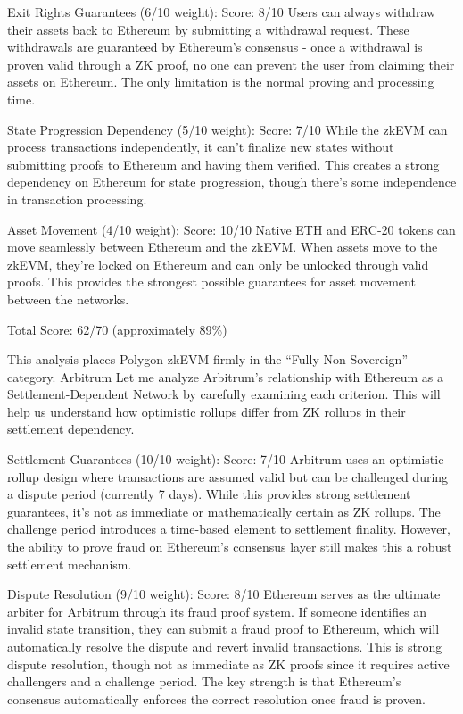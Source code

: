 \documentclass[
  letterpaper,
  DIV=11,
  numbers=noendperiod]{scrreprt}
\begin{document}
Exit Rights Guarantees (6/10 weight): Score: 8/10 Users can always
withdraw their assets back to Ethereum by submitting a withdrawal
request. These withdrawals are guaranteed by Ethereum's consensus - once
a withdrawal is proven valid through a ZK proof, no one can prevent the
user from claiming their assets on Ethereum. The only limitation is the
normal proving and processing time.

State Progression Dependency (5/10 weight): Score: 7/10 While the zkEVM
can process transactions independently, it can't finalize new states
without submitting proofs to Ethereum and having them verified. This
creates a strong dependency on Ethereum for state progression, though
there's some independence in transaction processing.

Asset Movement (4/10 weight): Score: 10/10 Native ETH and ERC-20 tokens
can move seamlessly between Ethereum and the zkEVM. When assets move to
the zkEVM, they're locked on Ethereum and can only be unlocked through
valid proofs. This provides the strongest possible guarantees for asset
movement between the networks.

Total Score: 62/70 (approximately 89\%)

This analysis places Polygon zkEVM firmly in the ``Fully Non-Sovereign''
category. Arbitrum Let me analyze Arbitrum's relationship with Ethereum
as a Settlement-Dependent Network by carefully examining each criterion.
This will help us understand how optimistic rollups differ from ZK
rollups in their settlement dependency.

Settlement Guarantees (10/10 weight): Score: 7/10 Arbitrum uses an
optimistic rollup design where transactions are assumed valid but can be
challenged during a dispute period (currently 7 days). While this
provides strong settlement guarantees, it's not as immediate or
mathematically certain as ZK rollups. The challenge period introduces a
time-based element to settlement finality. However, the ability to prove
fraud on Ethereum's consensus layer still makes this a robust settlement
mechanism.

Dispute Resolution (9/10 weight): Score: 8/10 Ethereum serves as the
ultimate arbiter for Arbitrum through its fraud proof system. If someone
identifies an invalid state transition, they can submit a fraud proof to
Ethereum, which will automatically resolve the dispute and revert
invalid transactions. This is strong dispute resolution, though not as
immediate as ZK proofs since it requires active challengers and a
challenge period. The key strength is that Ethereum's consensus
automatically enforces the correct resolution once fraud is proven.
\end{document}
